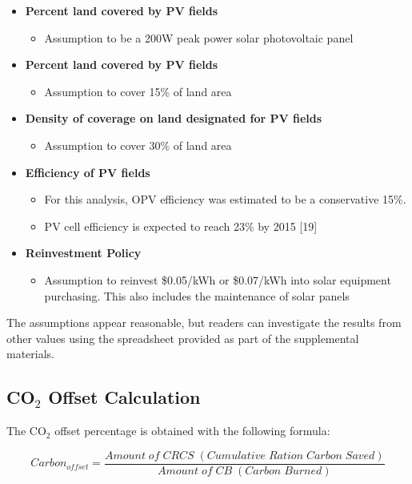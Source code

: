 \documentclass[11pt]{article}
\begin{document}
\begin{itemize}
\item {\bf Percent land covered by PV fields}
\begin{itemize}
\item Assumption to be a 200W peak power solar photovoltaic panel
\end{itemize}
\item {\bf Percent land covered by PV fields}
\begin{itemize}
\item Assumption to cover 15\% of land area
\end{itemize}
\item {\bf Density of coverage on land designated for PV fields}
\begin{itemize}
\item	Assumption to cover 30\% of land area
\end{itemize}
\item {\bf Efficiency of PV fields}
\begin{itemize}
\item For this analysis, OPV efficiency was estimated to be a conservative 15\%.
\item PV cell efficiency is expected to reach 23\% by 2015 [19]
\end{itemize}
\item {\bf Reinvestment Policy}
\begin{itemize}
\item Assumption to reinvest \$0.05/kWh or \$0.07/kWh into solar equipment purchasing. This  also includes the maintenance of solar panels
\end{itemize}
\end{itemize}

The assumptions appear reasonable, but readers can investigate the results from other values using the spreadsheet provided as part of the supplemental materials. 

\subsection{CO$_2$ Offset Calculation}

The CO$_2$ offset percentage is obtained with the following formula:

\begin{displaymath}
Carbon_{offset} = \frac{Amount \;of\; CRCS \;(Cumulative \;Ration \;Carbon \;Saved)}{Amount \;of \;CB \;(Carbon\; Burned)}
\end{displaymath}
\end{document}
